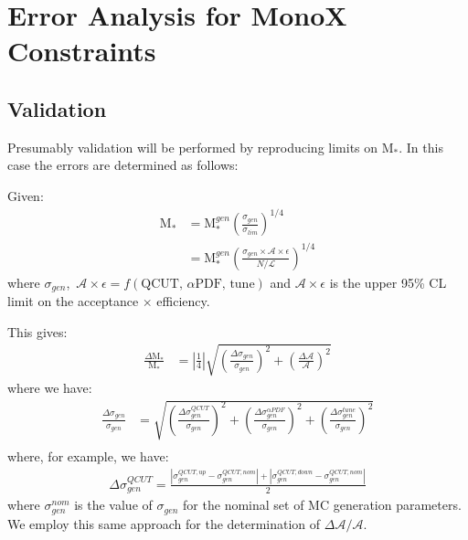 \documentclass[a4paper,12pt,oneside]{report} %
\begin{document}
\section*{Error Analysis for MonoX Constraints}

\subsection*{Validation}
\begin{flushleft}
Presumably validation will be performed by reproducing limits on M$_{*}$. In this case the errors are determined as follows:
\bigskip

Given:
\begin{align}
\mbox{M}_{*} &= \mbox{M}_{*}^{gen}\left(\frac{\sigma_{gen}}{\sigma_{lim}}\right)^{1/4}\\
&= \mbox{M}_{*}^{gen}\left(\frac{\sigma_{gen}\times\mathcal{A}\times\epsilon}{N/\mathcal{L}}\right)^{1/4}
\end{align}
where $\sigma_{gen}$\mbox{, }$\mathcal{A}\times\epsilon = f(\mbox{QCUT, $\alpha$PDF, tune})$ and $\mathcal{A}\times\epsilon$ is the upper 95\% CL limit on the acceptance $\times$ efficiency.
\bigskip

This gives:
\begin{align}
\frac{\Delta\mbox{M}_{*}}{\mbox{M}_{*}} &= \left|\frac{1}{4}\right|\sqrt{\left(\frac{\Delta\sigma_{gen}}{\sigma_{gen}}\right)^{2} + \left(\frac{\Delta\mathcal{A}}{\mathcal{A}}\right)^{2}}
\end{align}
where we have:
\begin{align}
\frac{\Delta\sigma_{gen}}{\sigma_{gen}} &= \sqrt{\left(\frac{\Delta\sigma_{gen}^{QCUT}}{\sigma_{gen}}\right)^{2} +\left(\frac{\Delta\sigma_{gen}^{\alpha PDF}}{\sigma_{gen}}\right)^{2} + \left(\frac{\Delta\sigma_{gen}^{tune}}{\sigma_{gen}}\right)^{2}} \\
\end{align}
where, for example, we have:
\begin{align}
\Delta\sigma_{gen}^{QCUT} = \frac{|\sigma_{gen}^{QCUT,up} - \sigma_{gen}^{QCUT,nom}| + |\sigma_{gen}^{QCUT,down} - \sigma_{gen}^{QCUT,nom}|}{2}
\end{align}
where $\sigma_{gen}^{nom}$ is the value of $\sigma_{gen}$ for the nominal set of MC generation parameters. We employ this same approach for the determination of $\Delta\mathcal{A}/\mathcal{A}$.
\end{flushleft}

\end{document}

